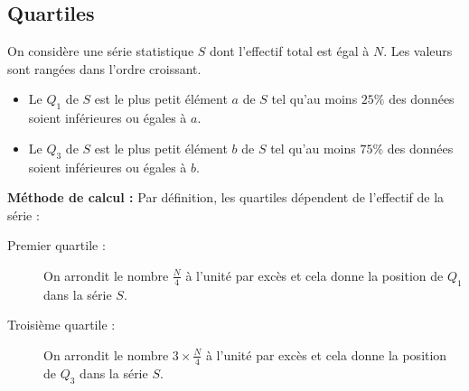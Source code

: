 \documentclass[10pt,openright,twoside,french]{book}
\begin{document}
\begin{Exemple}

\end{Exemple}\vspace*{2cm}

\subsection{Quartiles}

\begin{Defi}
    On considère une série statistique $S$ dont l'effectif total est égal à $N$. Les valeurs sont rangées dans l'ordre croissant.
    \begin{itemize}
        \item Le  $Q_1$ de $S$ est le plus petit élément $a$ de $S$ tel qu'au moins $25\%$ des données soient inférieures ou égales à $a$.
        \item Le  $Q_3$ de $S$ est le plus petit élément $b$ de $S$ tel qu'au moins $75\%$ des données soient inférieures ou égales à $b$.
    \end{itemize}

\begin{center}
\end{center}
\end{Defi}

\textbf{Méthode de calcul :} Par définition, les quartiles dépendent de l'effectif de la série :
\begin{description}
    \item[Premier quartile :] On arrondit le nombre $\frac{N}{4}$ à l'unité par excès et cela donne la position de $Q_1$ dans la série $S$.
    \item[Troisième quartile :] On arrondit le nombre $3\times\frac{N}{4}$ à l'unité par excès et cela donne la position de $Q_3$ dans la série $S$.
\end{description}

\begin{Exemple}

\end{Exemple}
\end{document}

